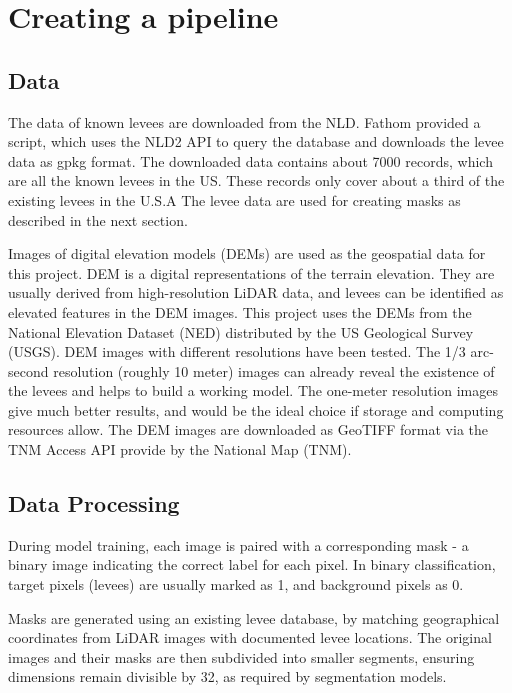 \documentclass[NOTE, disdraft=true, UKenglish]{\DISCDTLATEXPATH UCLCDTDISdoc}
\begin{document}
\section{Creating a pipeline}
\label{sec:results}
%
\subsection{Data}

The data of known levees are downloaded from the NLD. Fathom provided a script, which uses the NLD2 API to query the database and downloads the levee data as gpkg format. The downloaded data contains about 7000 records, which are all the known levees in the US. These records only cover about a third of the existing levees in the U.S.A The levee data are used for creating masks as described in the next section.

Images of digital elevation models (DEMs) are used as the geospatial data for this project. DEM is a digital representations of the terrain elevation. They are usually derived from high-resolution LiDAR data, and levees can be identified as elevated features in the DEM images. This project uses the DEMs from the National Elevation Dataset (NED) distributed by the US Geological Survey (USGS). DEM images with different resolutions have been tested. The 1/3 arc-second resolution (roughly 10 meter) images can already reveal the existence of the levees and helps to build a working model. The one-meter resolution images give much better results, and would be the ideal choice if storage and computing resources allow. The DEM images are downloaded as GeoTIFF format via the TNM Access API provide by the National Map (TNM).

\subsection{Data Processing}

During model training, each image is paired with a corresponding mask - a binary image indicating the correct label for each pixel. In binary classification, target pixels (levees) are usually marked as 1, and background pixels as 0.

Masks are generated using an existing levee database, by matching geographical coordinates from LiDAR images with documented levee locations. The original images and their masks are then subdivided into smaller segments, ensuring dimensions remain divisible by 32, as required by segmentation models.
\end{document}
